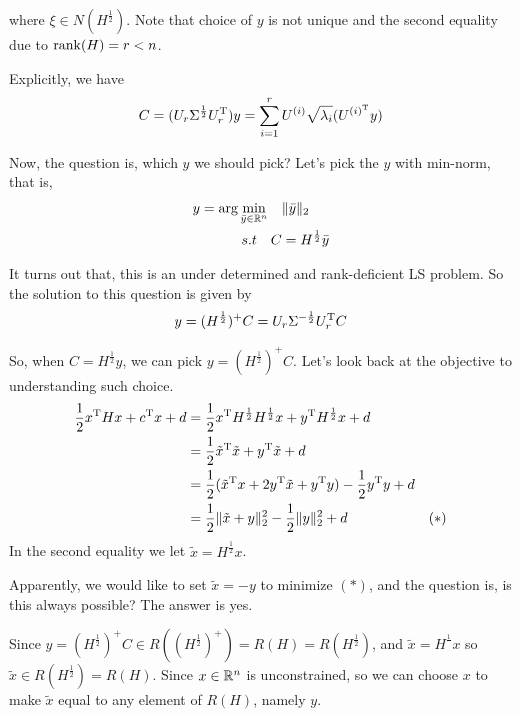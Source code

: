 where $\xi \in N(H^{\frac{1}{2}})$. Note that choice of $y$ is not unique and the second equality due to $\operatorname{rank}(H)= r<n$. 

Explicitly, we have 
\begin{equation*}
C = (U_r\Sigma^{\frac{1}{2}}U_r^{{\rm T}})y = \sum^r_{i=1}U^{(i)}\sqrt{\lambda_i}(U^{(i)^{{\rm T}}}y)
\end{equation*}

Now, the question is, which $y$ we should pick? Let's pick the $y$ with min-norm, that is, 
\begin{align*}
y=\arg\min_{\bar{y}\in\mathbb{R}^n}\quad&\Vert \bar{y}\Vert_2\\
s.t\quad  C &= H^{\frac{1}{2}}\bar{y}
\end{align*}

It turns out that, this is an under determined and rank-deficient LS problem. So the solution to this question is given by
$$y = (H^{\frac{1}{2}})^+C = U_r \Sigma^{-\frac{1}{2}} U_r^{{\rm T}} C$$


So, when $C = H^{\frac{1}{2}}y$, we can pick $y = (H^{\frac{1}{2}})^+C$. Let's look back at the objective to understanding such choice.
\begin{align*}
\frac{1}{2}x^{{\rm T}}Hx + c^{{\rm T}}x + d &= \frac{1}{2}x^{{\rm T}}H^{\frac{1}{2}}H^{\frac{1}{2}}x+y^{{\rm T}}H^{\frac{1}{2}}x + d\\
&= \frac{1}{2}\tilde{x}^{{\rm T}}\tilde{x} + y^{{\rm T}}\tilde{x} + d\\
&= \frac{1}{2}(\tilde{x}^{{\rm T}}x+2y^{{\rm T}}\tilde{x}+y^{{\rm T}}y) - \frac{1}{2}y^{{\rm T}}y + d \\
&= \frac{1}{2}\Vert\tilde{x}+y\Vert^2_2 - \frac{1}{2}\Vert y \Vert^2_2 + d &(*)
\end{align*}
In the second equality we let $\tilde{x} = H^{\frac{1}{2}} x$.

Apparently, we would like to set $\tilde{x} = -y$ to minimize $(*)$, and the question is, is this always possible? The answer is yes.

Since $y = (H^{\frac{1}{2}})^+C\in R((H^{\frac{1}{2}})^+) = R(H) = R(H^{\frac{1}{2}})$, and $\tilde{x}=H^{\frac{1}{}} x$ so $\tilde{x} \in R\left(H^{\frac{1}{2}}\right) = R(H)$. Since $x\in \mathbb{R}^n$ is unconstrained, so we can choose $x$ to make $\tilde{x}$ equal to any element of $R(H)$, namely $y$. 

